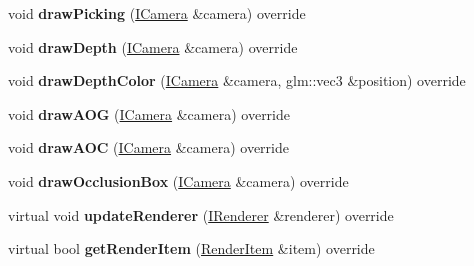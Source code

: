 \begin{DoxyCompactItemize}
\item 
void {\bfseries draw\+Picking} (\hyperlink{classflw_1_1flf_1_1ICamera}{I\+Camera} \&camera) override\hypertarget{classflw_1_1flf_1_1Mesh_a37b6ab72fb1beea5f29701c844a47d49}{}\label{classflw_1_1flf_1_1Mesh_a37b6ab72fb1beea5f29701c844a47d49}

\item 
void {\bfseries draw\+Depth} (\hyperlink{classflw_1_1flf_1_1ICamera}{I\+Camera} \&camera) override\hypertarget{classflw_1_1flf_1_1Mesh_ae8710aaf0b7354622af2ad55e0570490}{}\label{classflw_1_1flf_1_1Mesh_ae8710aaf0b7354622af2ad55e0570490}

\item 
void {\bfseries draw\+Depth\+Color} (\hyperlink{classflw_1_1flf_1_1ICamera}{I\+Camera} \&camera, glm\+::vec3 \&position) override\hypertarget{classflw_1_1flf_1_1Mesh_a435ad4cabc8f1611b713c6b09082e838}{}\label{classflw_1_1flf_1_1Mesh_a435ad4cabc8f1611b713c6b09082e838}

\item 
void {\bfseries draw\+A\+OG} (\hyperlink{classflw_1_1flf_1_1ICamera}{I\+Camera} \&camera) override\hypertarget{classflw_1_1flf_1_1Mesh_a43695718bb7376f783c19497add06329}{}\label{classflw_1_1flf_1_1Mesh_a43695718bb7376f783c19497add06329}

\item 
void {\bfseries draw\+A\+OC} (\hyperlink{classflw_1_1flf_1_1ICamera}{I\+Camera} \&camera) override\hypertarget{classflw_1_1flf_1_1Mesh_af6cdec25aeb22e3133944ea150c24074}{}\label{classflw_1_1flf_1_1Mesh_af6cdec25aeb22e3133944ea150c24074}

\item 
void {\bfseries draw\+Occlusion\+Box} (\hyperlink{classflw_1_1flf_1_1ICamera}{I\+Camera} \&camera) override\hypertarget{classflw_1_1flf_1_1Mesh_a4a48059089ddc47c0d61e01d92b57e8e}{}\label{classflw_1_1flf_1_1Mesh_a4a48059089ddc47c0d61e01d92b57e8e}

\item 
virtual void {\bfseries update\+Renderer} (\hyperlink{classflw_1_1flf_1_1IRenderer}{I\+Renderer} \&renderer) override\hypertarget{classflw_1_1flf_1_1Mesh_a40e9cc7c8a77c3d494193baefc59ad7f}{}\label{classflw_1_1flf_1_1Mesh_a40e9cc7c8a77c3d494193baefc59ad7f}

\item 
virtual bool {\bfseries get\+Render\+Item} (\hyperlink{structflw_1_1flf_1_1RenderItem}{Render\+Item} \&item) override\hypertarget{classflw_1_1flf_1_1Mesh_a2d57bb274b8660d247fda746bed31c8a}{}\label{classflw_1_1flf_1_1Mesh_a2d57bb274b8660d247fda746bed31c8a}


\end{DoxyCompactItemize}
